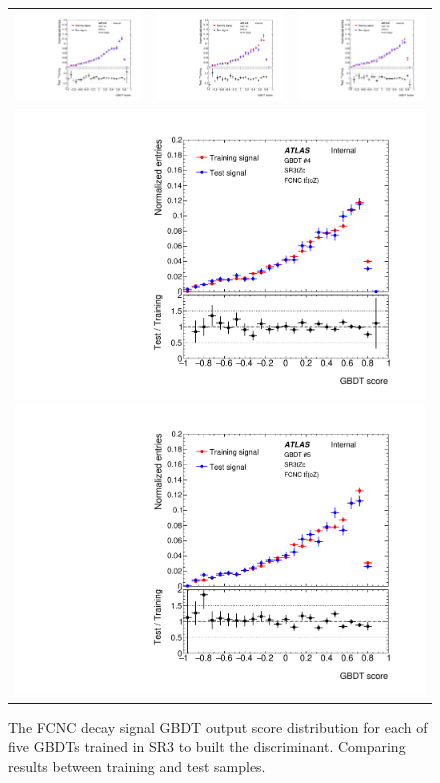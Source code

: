 \begin{figure}[htbp]
	\centering
	\begin{tabular}{ccc}
		\includegraphics[width=.3\textwidth]{Chapters/CH5/figures/SR3_UsingSMT/BDT/GBDT_signal_Fold1} &
		\includegraphics[width=.3\textwidth]{Chapters/CH5/figures/SR3_UsingSMT/BDT/GBDT_signal_Fold2} &
		\includegraphics[width=.3\textwidth]{Chapters/CH5/figures/SR3_UsingSMT/BDT/GBDT_signal_Fold3} \\ 
		\multicolumn{3}{c}{
			\includegraphics[width=.3\textwidth]{Chapters/CH5/figures/SR3_UsingSMT/BDT/GBDT_signal_Fold4}
			\includegraphics[width=.3\textwidth]{Chapters/CH5/figures/SR3_UsingSMT/BDT/GBDT_signal_Fold5}} \\
	\end{tabular}
	\caption{ The FCNC \tZc \ttbar decay signal GBDT output score distribution for each of five GBDTs trained in SR3 to built the \Dthree discriminant. 
		Comparing results between training and test samples.
	}%
	\label{fig:separation:SR3:GBDTsig}
\end{figure}

